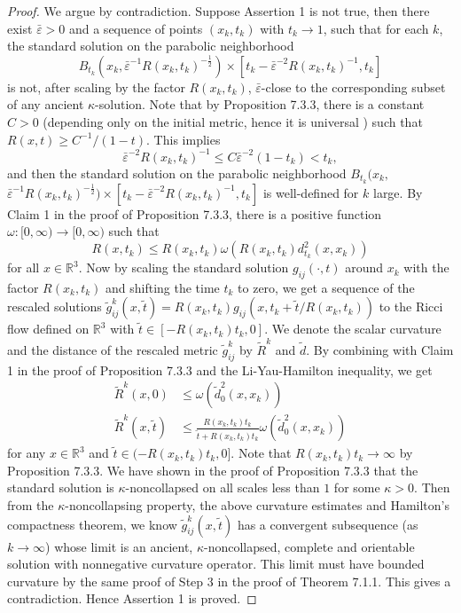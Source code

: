 \begin{proof}
We argue by contradiction. Suppose Assertion 1 is not true, then
there exist $\bar\varepsilon>0$ and a sequence of points
$(x_{k},t_k)$ with $t_{k}\rightarrow 1$, such that for each $k$,
the standard solution on the parabolic neighborhood
$$
B_{t_k}(x_k,\bar\varepsilon^{-1}R(x_k,t_k)^{-\frac{1}{2}}) \times
[t_k-\bar\varepsilon^{-2}R(x_k,t_k)^{-1},t_k]
$$
is not, after scaling by the factor $R(x_k,t_k)$,
$\bar\varepsilon$-close to the corresponding subset of any ancient
$\kappa$-solution. Note that by Proposition 7.3.3, there is a
constant $C>0$ (depending only on the initial metric, hence it is
universal ) such that $R(x,t)\geq C^{-1}/(1-t)$. This implies
$$
\bar\varepsilon^{-2}R(x_k,t_k)^{-1} \leq
C\bar\varepsilon^{-2}(1-t_k)<t_k ,
$$
and\; then\; the\; standard\; solution\; on\; the\; parabolic\;
neighborhood\; $B_{t_k}(x_k,$
$\bar\varepsilon^{-1}R(x_k,t_k)^{-\frac{1}{2}}) \times
[t_k-\bar\varepsilon^{-2}R(x_k,t_k)^{-1},t_k]$ is well-defined for
$k$ large. By Claim 1 in the proof of Proposition 7.3.3, there is
a positive function $\omega:[0,\infty)\rightarrow[0,\infty)$ such
that
$$
  R(x,t_k)\leq R(x_k,t_k)\omega(R(x_k,t_k)d_{t_k}^{2}(x,x_k))
$$
for all $x\in \mathbb{R}^3$.  Now by scaling the standard solution
$g_{ij}(\cdot,t)$ around $x_k$ with the factor $R(x_k,t_k)$ and
shifting the time $t_k$ to zero, we get a sequence of the rescaled
solutions $
\tilde{g}^{k}_{ij}(x,\tilde{t})=R(x_k,t_k)g_{ij}(x,t_k+\tilde{t}/R(x_k,t_k))$
to the Ricci flow defined on $\mathbb{R}^3$ with $\tilde{t}\in
[-R(x_k,t_k)t_k,0]$. We denote the scalar curvature and the
distance of the rescaled metric $\tilde{g}^{k}_{ij}$ by
$\tilde{R}^{k}$ and $\tilde{d}$. By combining with Claim 1 in the
proof of Proposition 7.3.3 and the Li-Yau-Hamilton inequality, we
get
\begin{align*}
\tilde{R}^{k}(x,0)& \leq \omega(\tilde{d}_{0}^{2}(x,x_k))\\
\tilde{R}^{k}(x,\tilde{t})& \leq
\frac{R(x_k,t_k)t_k}{\tilde{t}+R(x_k,t_k)t_k}
\omega(\tilde{d}_{0}^{2}(x,x_k))
\end{align*}
for any $x\in \mathbb{R}^3$ and $\tilde{t}\in (-R(x_k,t_k)t_k,0]$.
Note that $R(x_k,t_k)t_k\rightarrow \infty$ by Proposition 7.3.3.
We have shown in the proof of Proposition 7.3.3 that the standard
solution is $\kappa$-noncollapsed on all scales less than $1$ for
some $\kappa>0$. Then from the $\kappa$-noncollapsing property,
the above curvature estimates and Hamilton's compactness theorem,
we know $\tilde{g}^{k}_{ij}(x,\tilde{t})$ has a convergent
subsequence (as $k\rightarrow\infty$) whose limit is an ancient,
$\kappa$-noncollapsed, complete and orientable solution with
nonnegative curvature operator. This limit must have bounded
curvature by the same proof of Step 3 in the proof of Theorem
7.1.1. This gives a contradiction. Hence Assertion 1 is proved.


\end{proof}
